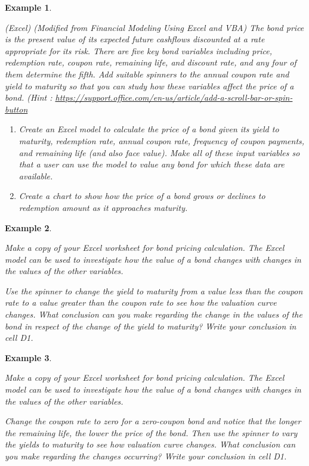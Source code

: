 \documentclass[
]{article}
\theoremstyle{definition}
\theoremstyle{definition}
\newtheorem{example}{Example}[section]
\theoremstyle{definition}
\theoremstyle{definition}
\theoremstyle{remark}
\begin{document}
\begin{example}
\protect\hypertarget{exm:unlabeled-div-14}{}\label{exm:unlabeled-div-14}

\emph{(Excel) (Modified from Financial Modeling Using Excel
and VBA) The bond price is the present value of its expected future
cashflows discounted at a rate appropriate for its risk. There are five
key bond variables including price, redemption rate, coupon rate,
remaining life, and discount rate, and any four of them determine the
fifth. Add suitable spinners to the annual coupon rate and yield to
maturity so that you can study how these variables affect the price of a
bond. (Hint :
\url{https://support.office.com/en-us/article/add-a-scroll-bar-or-spin-button}}

\begin{enumerate}
\def\labelenumi{\arabic{enumi}.}
\item
  \emph{Create an Excel model to calculate the price of a bond given its
  yield to maturity, redemption rate, annual coupon rate, frequency of
  coupon payments, and remaining life (and also face value). Make all
  of these input variables so that a user can use the model to value
  any bond for which these data are available.}
\item
  \emph{Create a chart to show how the price of a bond grows or declines to
  redemption amount as it approaches maturity.}
\end{enumerate}

\end{example}

\begin{example}
\protect\hypertarget{exm:unlabeled-div-15}{}\label{exm:unlabeled-div-15}

\emph{Make a copy of your Excel worksheet for bond pricing
calculation. The Excel model can be used to investigate how the value of
a bond changes with changes in the values of the other variables.}

\emph{Use the spinner to change the yield to maturity from a value less than
the coupon rate to a value greater than the coupon rate to see how the
valuation curve changes. What conclusion can you make regarding the
change in the values of the bond in respect of the change of the yield
to maturity? Write your conclusion in cell D1.}

\end{example}

\begin{example}
\protect\hypertarget{exm:unlabeled-div-16}{}\label{exm:unlabeled-div-16}

\emph{Make a copy of your Excel worksheet for bond pricing
calculation. The Excel model can be used to investigate how the value of
a bond changes with changes in the values of the other variables.}

\emph{Change the coupon rate to zero for a zero-coupon bond and notice that
the longer the remaining life, the lower the price of the bond. Then use
the spinner to vary the yields to maturity to see how valuation curve
changes. What conclusion can you make regarding the changes occurring?
Write your conclusion in cell D1.}

\end{example}
\end{document}

